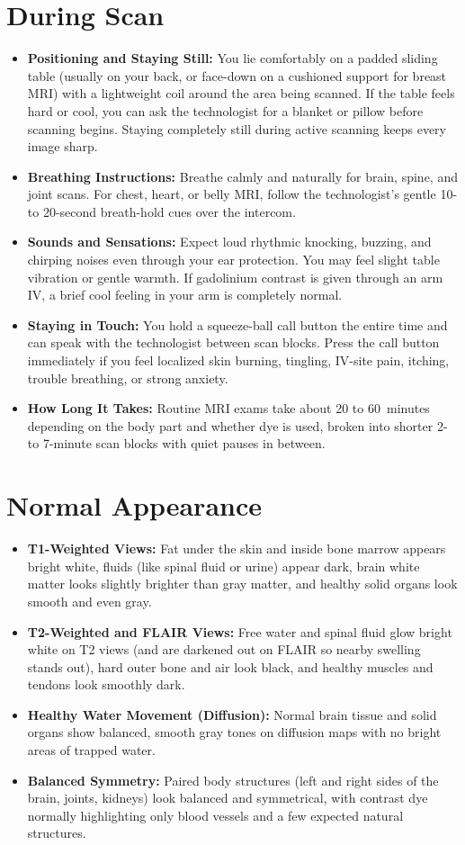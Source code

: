 \section{During Scan}
\begin{itemize}
\item \textbf{Positioning and Staying Still:} You lie comfortably on a padded sliding table (usually on your back, or face-down on a cushioned support for breast MRI) with a lightweight coil around the area being scanned. If the table feels hard or cool, you can ask the technologist for a blanket or pillow before scanning begins. Staying completely still during active scanning keeps every image sharp.
\item \textbf{Breathing Instructions:} Breathe calmly and naturally for brain, spine, and joint scans. For chest, heart, or belly MRI, follow the technologist's gentle 10- to 20-second breath-hold cues over the intercom.
\item \textbf{Sounds and Sensations:} Expect loud rhythmic knocking, buzzing, and chirping noises even through your ear protection. You may feel slight table vibration or gentle warmth. If gadolinium contrast is given through an arm IV, a brief cool feeling in your arm is completely normal.
\item \textbf{Staying in Touch:} You hold a squeeze-ball call button the entire time and can speak with the technologist between scan blocks. Press the call button immediately if you feel localized skin burning, tingling, IV-site pain, itching, trouble breathing, or strong anxiety.
\item \textbf{How Long It Takes:} Routine MRI exams take about 20 to 60~minutes depending on the body part and whether dye is used, broken into shorter 2- to 7-minute scan blocks with quiet pauses in between.
\end{itemize}

\section{Normal Appearance}
\begin{itemize}
\item \textbf{T1-Weighted Views:} Fat under the skin and inside bone marrow appears bright white, fluids (like spinal fluid or urine) appear dark, brain white matter looks slightly brighter than gray matter, and healthy solid organs look smooth and even gray.
\item \textbf{T2-Weighted and FLAIR Views:} Free water and spinal fluid glow bright white on T2 views (and are darkened out on FLAIR so nearby swelling stands out), hard outer bone and air look black, and healthy muscles and tendons look smoothly dark.
\item \textbf{Healthy Water Movement (Diffusion):} Normal brain tissue and solid organs show balanced, smooth gray tones on diffusion maps with no bright areas of trapped water.
\item \textbf{Balanced Symmetry:} Paired body structures (left and right sides of the brain, joints, kidneys) look balanced and symmetrical, with contrast dye normally highlighting only blood vessels and a few expected natural structures.
\end{itemize}

